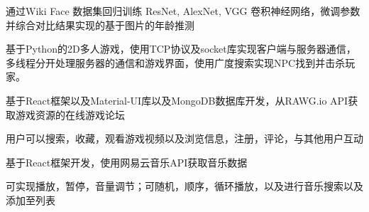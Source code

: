 \documentclass[]{deedy-resume-openfont}
\begin{document}
\begin{minipage}[t]{0.73\textwidth}
\sectionsep

\begin{tightemize}
    \item 通过Wiki Face 数据集回归训练 ResNet, AlexNet, VGG 卷积神经网络，微调参数并综合对比结果实现的基于图片的年龄推测
    \end{tightemize}

\sectionsep

\begin{tightemize}
    \item 基于Python的2D多人游戏，使用TCP协议及socket库实现客户端与服务器通信，
    多线程分开处理服务器的通信和游戏界面，使用广度搜索实现NPC找到并击杀玩家。
    \end{tightemize}

\sectionsep

\begin{tightemize}
    \item 基于React框架以及Material-UI库以及MongoDB数据库开发，从RAWG.io API获取游戏资源的在线游戏论坛
    \item 用户可以搜索，收藏，观看游戏视频以及浏览信息，注册，评论，与其他用户互动
    \end{tightemize}
    
\sectionsep

\begin{tightemize}
    \item 基于React框架开发，使用网易云音乐API获取音乐数据
    \item 可实现播放，暂停，音量调节；可随机，顺序，循环播放，以及进行音乐搜索以及
    添加至列表
    \end{tightemize}





% 
% 

\end{minipage} 
\end{document}
